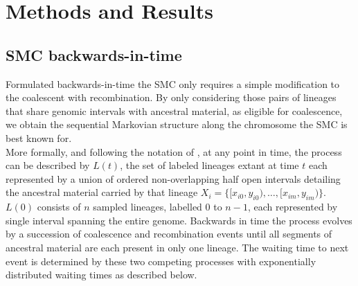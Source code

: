 \documentclass{article}
\begin{document}






\section{Methods and Results}
\subsection{SMC backwards-in-time}\label{par:description}

Formulated backwards-in-time the SMC \citep{mcvean_approximating_2005} only requires a simple modification to the 
coalescent with recombination. By only considering those pairs of 
lineages that share 
genomic intervals with ancestral material, as eligible for coalescence, we obtain the 
sequential Markovian structure along the chromosome the SMC is best known for.\\

More formally, and following the notation of \citet{mcvean_approximating_2005}, at any 
point in time, the process can be described by $L(t)$, the set of labeled lineages 
extant at time $t$ each represented by a union of ordered non-overlapping half open 
intervals detailing the ancestral material 
carried by that lineage $X_i = \{[x_{i0}, y_{i0}), \dotsc, [x_{im}, y_{im})\}$.
$L(0)$ consists of $n$ sampled lineages, labelled $0$ to $n-1$, each represented by 
single interval spanning the entire genome.
Backwards in time the process evolves by a succession of coalescence and recombination 
events until all segments of ancestral material are each present in only one lineage. 
The waiting time to next event is determined by these two competing processes with exponentially 
distributed waiting times as described below.\\
\end{document}
